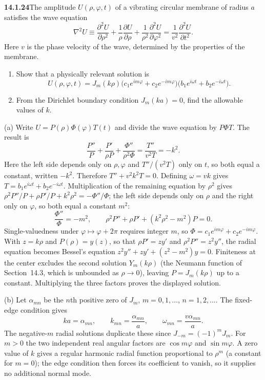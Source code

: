 \par\bigskip
\noindent\textbf{14.1.24}\quad The amplitude $U(\rho,\varphi,t)$ of a
vibrating circular membrane of radius $a$ satisfies the wave equation
\[
\nabla^{2}U\equiv\frac{\partial^{2}U}{\partial\rho^{2}}
+\frac{1}{\rho}\frac{\partial U}{\partial\rho}
+\frac{1}{\rho^{2}}\frac{\partial^{2}U}{\partial\varphi^{2}}
=\frac{1}{v^{2}}\frac{\partial^{2}U}{\partial t^{2}}.
\]
Here $v$ is the phase velocity of the wave, determined by the
properties of the membrane.
\begin{enumerate}
\item[(a)] Show that a physically relevant solution is
\[
U(\rho,\varphi,t)=J_{m}(k\rho)\big(c_{1}e^{im\varphi}
+c_{2}e^{-im\varphi}\big)\big(b_{1}e^{i\omega t}+b_{2}e^{-i\omega t}\big).
\]
\item[(b)] From the Dirichlet boundary condition $J_{m}(ka)=0$, find
the allowable values of $k$.
\end{enumerate}
\par{}
\solution
(a) Write $U=P(\rho)\Phi(\varphi)T(t)$ and divide the wave
equation by $P\Phi T$. The result is
\[
\frac{P''}P+\frac{P'}{\rho P}
+\frac{\Phi''}{\rho^2\Phi}=\frac{T''}{v^2T}=-k^2.
\]
Here the left side depends only on $\rho,\varphi$ and $T''/(v^2T)$
only on $t$, so both equal a constant, written $-k^2$.
Therefore $T''+v^2k^2T=0$. Defining $\omega=vk$ gives
$T=b_1e^{i\omega t}+b_2e^{-i\omega t}$. Multiplication of the
remaining equation by $\rho^2$ gives
$\rho^2P''/P+\rho P'/P+k^2\rho^2=-\Phi''/\Phi$; the left side depends
only on $\rho$ and the right only on $\varphi$, so both equal a
constant $m^2$:
\[
\frac{\Phi''}\Phi=-m^2,\qquad
\rho^2P''+\rho P'+(k^2\rho^2-m^2)P=0.
\]
Single-valuedness under $\varphi\mapsto\varphi+2\pi$ requires integer
$m$, so $\Phi=c_1e^{im\varphi}+c_2e^{-im\varphi}$. With $z=k\rho$
and $P(\rho)=y(z)$, so that $\rho P'=zy'$ and $\rho^2P''=z^2y''$,
the radial equation becomes Bessel's equation
$z^2y''+zy'+(z^2-m^2)y=0$. Finiteness at the center
excludes the second solution $Y_m(k\rho)$ (the Neumann function of
Section~14.3, which is unbounded as $\rho\to0$), leaving
$P=J_m(k\rho)$ up to a constant. Multiplying
the three factors proves the displayed solution.

(b) Let $\alpha_{mn}$ be the $n$th positive zero of $J_m$,
$m=0,1,\ldots$, $n=1,2,\ldots$. The fixed-edge condition gives
\[
ka=\alpha_{mn},\qquad
\boxed{k_{mn}=\frac{\alpha_{mn}}a,\qquad
\omega_{mn}=\frac{v\alpha_{mn}}a}.
\]
The negative-$m$ radial solutions duplicate these since
$J_{-m}=(-1)^mJ_m$. For $m>0$ the two independent real angular
factors are $\cos m\varphi$ and $\sin m\varphi$. A zero value of
$k$ gives a regular harmonic radial function proportional to
$\rho^m$ (a constant for $m=0$); the edge condition then forces its
coefficient to vanish, so it supplies no additional normal mode.

